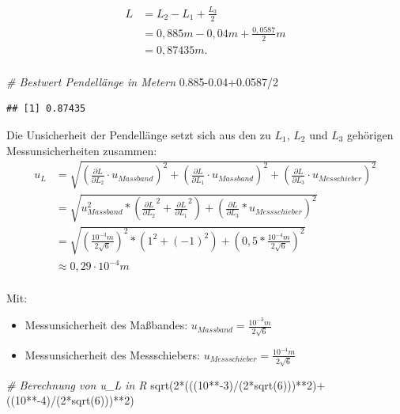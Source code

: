 \documentclass[
  9pt,
]{article}
\newenvironment{Shaded}{\begin{snugshade}}{\end{snugshade}}
\newcommand{\CommentTok}[1]{\textcolor[rgb]{0.56,0.35,0.01}{\textit{#1}}}
\newcommand{\DecValTok}[1]{\textcolor[rgb]{0.00,0.00,0.81}{#1}}
\newcommand{\FloatTok}[1]{\textcolor[rgb]{0.00,0.00,0.81}{#1}}
\newcommand{\FunctionTok}[1]{\textcolor[rgb]{0.00,0.00,0.00}{#1}}
\newcommand{\NormalTok}[1]{#1}
\newcommand{\SpecialCharTok}[1]{\textcolor[rgb]{0.00,0.00,0.00}{#1}}
\begin{document}
\begin{align*}
L&= L_2-L_1+\frac{L_{3}}{2}\\
 &=0,885m-0,04m+\frac{0,0587}{2}m\\
 &=0,87435m.\\
\end{align*}

\begin{Shaded}
\begin{Highlighting}[]
\CommentTok{\# Bestwert Pendellänge in Metern}
\FloatTok{0.885{-}0.04+0.0587}\SpecialCharTok{/}\DecValTok{2}
\end{Highlighting}
\end{Shaded}

\begin{verbatim}
## [1] 0.87435
\end{verbatim}

Die Unsicherheit der Pendellänge setzt sich aus den zu \(L_1\), \(L_2\)
und \(L_3\) gehörigen Messunsicherheiten zusammen:
\begin{equation}\label{Pendel:U_L}
\begin{split}
u_L&= \sqrt{(\frac{\partial L}{\partial L_2} \cdot u_{Massband})^2+(\frac{\partial L}{\partial L_1} \cdot u_{Massband})^2+(\frac{\partial L}{\partial L_{3}} \cdot u_{Messchieber})^2}\\
&= \sqrt{u_{Massband}^2*(\frac{\partial L}{\partial L_2}^2+\frac{\partial L}{\partial L_1}^2)+(\frac{\partial L}{\partial L_{3}}*u_{Messschieber})^2}\\
&=\sqrt{(\frac{10^{-3}m}{2\sqrt{6}})^2*(1^2+(-1)^2)+(0,5*\frac{10^{-4}m}{2\sqrt{6}})^2}\\
&\approx 0,29 \cdot 10^{-4}m\\
\end{split}
\end{equation}

Mit:

\begin{itemize}
  \item Messunsicherheit des Maßbandes: $u_{Massband}=\frac{10^{-3}m}{2\sqrt{6}}$
  \item Messunsicherheit des Messschiebers: $u_{Messschieber}=\frac{10^{-4}m}{2\sqrt{6}}$
\end{itemize}

\begin{Shaded}
\begin{Highlighting}[]
\CommentTok{\# Berechnung von u\_L in R}
\FunctionTok{sqrt}\NormalTok{(}\DecValTok{2}\SpecialCharTok{*}\NormalTok{(((}\DecValTok{10}\SpecialCharTok{**{-}}\DecValTok{3}\NormalTok{)}\SpecialCharTok{/}\NormalTok{(}\DecValTok{2}\SpecialCharTok{*}\FunctionTok{sqrt}\NormalTok{(}\DecValTok{6}\NormalTok{)))}\SpecialCharTok{**}\DecValTok{2}\NormalTok{)}\SpecialCharTok{+}\NormalTok{((}\DecValTok{10}\SpecialCharTok{**{-}}\DecValTok{4}\NormalTok{)}\SpecialCharTok{/}\NormalTok{(}\DecValTok{2}\SpecialCharTok{*}\FunctionTok{sqrt}\NormalTok{(}\DecValTok{6}\NormalTok{)))}\SpecialCharTok{**}\DecValTok{2}\NormalTok{)}
\end{Highlighting}
\end{Shaded}
\end{document}
